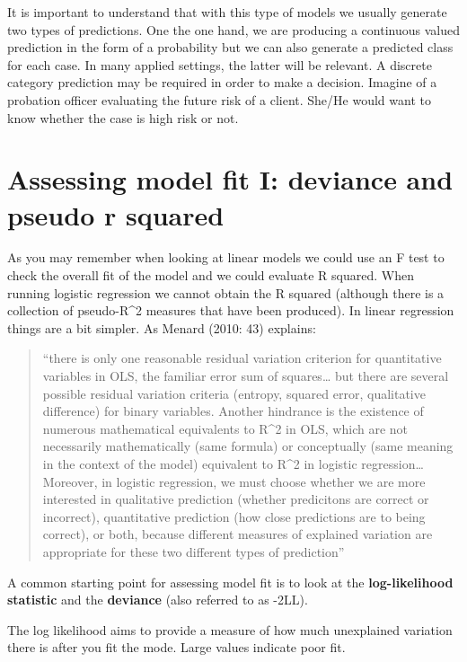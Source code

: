 \documentclass[
]{book}
\begin{document}
It is important to understand that with this type of models we usually generate two types of predictions. One the one hand, we are producing a continuous valued prediction in the form of a probability but we can also generate a predicted class for each case. In many applied settings, the latter will be relevant. A discrete category prediction may be required in order to make a decision. Imagine of a probation officer evaluating the future risk of a client. She/He would want to know whether the case is high risk or not.

\hypertarget{assessing-model-fit-i-deviance-and-pseudo-r-squared}{%
\section{Assessing model fit I: deviance and pseudo r squared}\label{assessing-model-fit-i-deviance-and-pseudo-r-squared}}

As you may remember when looking at linear models we could use an F test to check the overall fit of the model and we could evaluate R squared. When running logistic regression we cannot obtain the R squared (although there is a collection of pseudo-R\^{}2 measures that have been produced). In linear regression things are a bit simpler. As Menard (2010: 43) explains:

\begin{quote}
``there is only one reasonable residual variation criterion for quantitative variables in OLS, the familiar error sum of squares\ldots{} but there are several possible residual variation criteria (entropy, squared error, qualitative difference) for binary variables. Another hindrance is the existence of numerous mathematical equivalents to R\^{}2 in OLS, which are not necessarily mathematically (same formula) or conceptually (same meaning in the context of the model) equivalent to R\^{}2 in logistic regression\ldots{} Moreover, in logistic regression, we must choose whether we are more interested in qualitative prediction (whether predicitons are correct or incorrect), quantitative prediction (how close predictions are to being correct), or both, because different measures of explained variation are appropriate for these two different types of prediction''
\end{quote}

A common starting point for assessing model fit is to look at the \textbf{log-likelihood statistic} and the \textbf{deviance} (also referred to as -2LL).

The log likelihood aims to provide a measure of how much unexplained variation there is after you fit the mode. Large values indicate poor fit.
\end{document}
